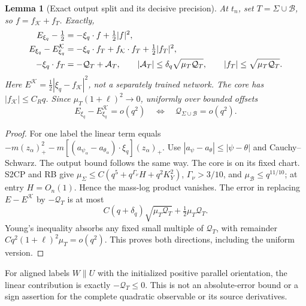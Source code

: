 \documentclass[11pt]{article}
\numberwithin{equation}{section}
\newtheorem{lemma}[theorem]{Lemma}
\theoremstyle{remark}\newtheorem{remark}[theorem]{Remark}
\newcommand{\KK}{\mathcal K}\newcommand{\BB}{\mathcal B}
\begin{document}
\begin{lemma}[Exact output split and its decisive precision]
\label{an07cwiv1:split}
At \(t_n\), set \(T=\Sigma\cup\BB\), so \(f=f_\KK+f_T\). Exactly,
\begin{align}
 E_{\xi_q}-\tfrac12
 &=-\xi_q\cdot f+\tfrac12|f|^2, \notag\\
 E_{\xi_q}-E_{\xi_q}^{\KK}
 &=-\xi_q\cdot f_T+f_\KK\cdot f_T+\tfrac12|f_T|^2,\notag\\
 -\xi_q\cdot f_T&=-\mathcal Q_T+\mathcal A_T,\qquad
 |\mathcal A_T|\le\delta_q\sqrt{\mu_T\mathcal Q_T},\qquad
 |f_T|\le\sqrt{\mu_T\mathcal Q_T}.
 \label{an07cwiv1:exactsplit}
\end{align}
Here \(E^\KK=\tfrac12|\xi_q-f_\KK|^2\), not a
separately trained network. The core has \(|f_\KK|\le C_Rq\).
Since \(\mu_T(1+\ell)^2\to0\), uniformly over bounded offsets
\begin{equation}
 E_{\xi_q}-E_{\xi_q}^{\KK}=o(q^2)
 \quad\Longleftrightarrow\quad
 \mathcal Q_{\Sigma\cup\BB}=o(q^2).
 \label{an07cwiv1:equivalence}
\end{equation}
\end{lemma}
\begin{proof}
For one label the linear term equals
\(-m(z_\alpha)_+^2
 -m[(a_{\psi_\alpha}-a_{\theta_\alpha})\cdot\xi_q](z_\alpha)_+\).
Use \(|a_\psi-a_\theta|\le|\psi-\theta|\) and
Cauchy--Schwarz. The output bound follows the same way.
The core is on its fixed chart. S2CP and RB give
\(\mu_\Sigma\le C(q^5+q^{\Gamma_\nu}H+q^2K_Y^2)\),
\(\Gamma_\nu>3/10\), and \(\mu_\BB\le q^{11/10}\);
at entry \(H=O_n(1)\). Hence the mass-log product vanishes.
The error in replacing \(E-E^\KK\) by \(-\mathcal Q_T\)
is at most
\[
 C(q+\delta_q)\sqrt{\mu_T\mathcal Q_T}
                 +\tfrac12\mu_T\mathcal Q_T.
 \]
Young's inequality absorbs any fixed small multiple of
\(\mathcal Q_T\), with remainder \(Cq^2(1+\ell)^2\mu_T=o(q^2)\).
This proves both directions, including the uniform version.
\end{proof}
For aligned labels \(W\parallel U\) with the initialized positive
parallel orientation, the linear contribution is exactly
\(-\mathcal Q_T\le0\). This is not an absolute-error bound
or a sign assertion for the complete quadratic observable
or its source derivatives.
\end{document}
